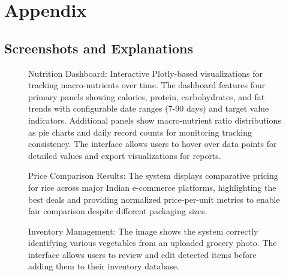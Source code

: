 \documentclass{ecai}
\begin{document}
\section*{Appendix}

\subsection*{Screenshots and Explanations}

\begin{figure}[h]
\centering
{}
\caption{Nutrition Dashboard: Interactive Plotly-based visualizations for tracking macro-nutrients over time. The dashboard features four primary panels showing calories, protein, carbohydrates, and fat trends with configurable date ranges (7-90 days) and target value indicators. Additional panels show macro-nutrient ratio distributions as pie charts and daily record counts for monitoring tracking consistency. The interface allows users to hover over data points for detailed values and export visualizations for reports.}
\end{figure}

\begin{figure}[h]
\centering
{}
\caption{Price Comparison Results: The system displays comparative pricing for rice across major Indian e-commerce platforms, highlighting the best deals and providing normalized price-per-unit metrics to enable fair comparison despite different packaging sizes.}
\end{figure}

\begin{figure}[h]
\centering
{}
\caption{Inventory Management: The image shows the system correctly identifying various vegetables from an uploaded grocery photo. The interface allows users to review and edit detected items before adding them to their inventory database.}
\end{figure}
\end{document}
